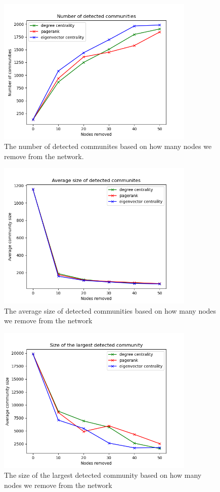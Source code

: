 \documentclass[9pt,twocolumn,twoside]{pnas-new}
\begin{document}
\begin{figure}[h!]
    \centering
    \includegraphics[width=1\linewidth,height=200pt]{num_coms.png}
    \caption{The number of detected communites based on how many nodes we remove from the network.}
    \label{num_coms}
\end{figure}

\begin{figure}[h!]
    \centering
    \includegraphics[width=1\linewidth,height=200pt]{avg_size.png}
    \caption{The average size of detected communities based on how many nodes we remove from the network}
    \label{avg_size}
\end{figure}

\begin{figure}[h!]
    \centering
    \includegraphics[width=1\linewidth,height=200pt]{max_size.png}
    \caption{The size of the largest detected community based on how many nodes we remove from the network}
    \label{max_size}
\end{figure}
\end{document}
